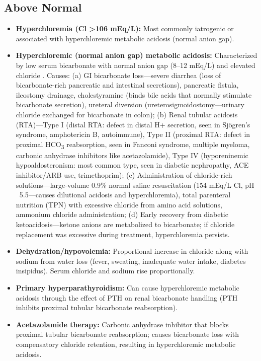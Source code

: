 \subsection*{Above Normal}
\begin{itemize}
  \item \textbf{Hyperchloremia (Cl >106 mEq/L):} Most commonly iatrogenic or associated with hyperchloremic metabolic acidosis (normal anion gap).
  \item \textbf{Hyperchloremic (normal anion gap) metabolic acidosis:} Characterized by low serum bicarbonate with normal anion gap (8--12 mEq/L) and elevated chloride \cite{seifter2014integration}. Causes: (a) GI bicarbonate loss---severe diarrhea (loss of bicarbonate-rich pancreatic and intestinal secretions), pancreatic fistula, ileostomy drainage, cholestyramine (binds bile acids that normally stimulate bicarbonate secretion), ureteral diversion (ureterosigmoidostomy---urinary chloride exchanged for bicarbonate in colon); (b) Renal tubular acidosis (RTA)---Type I (distal RTA: defect in distal H+ secretion, seen in Sj\"{o}gren's syndrome, amphotericin B, autoimmune), Type II (proximal RTA: defect in proximal HCO\textsubscript{3} reabsorption, seen in Fanconi syndrome, multiple myeloma, carbonic anhydrase inhibitors like acetazolamide), Type IV (hyporeninemic hypoaldosteronism: most common type, seen in diabetic nephropathy, ACE inhibitor/ARB use, trimethoprim); (c) Administration of chloride-rich solutions---large-volume 0.9\% normal saline resuscitation (154 mEq/L Cl, pH ~5.5---causes dilutional acidosis and hyperchloremia), total parenteral nutrition (TPN) with excessive chloride from amino acid solutions, ammonium chloride administration; (d) Early recovery from diabetic ketoacidosis---ketone anions are metabolized to bicarbonate; if chloride replacement was excessive during treatment, hyperchloremia persists.
  \item \textbf{Dehydration/hypovolemia:} Proportional increase in chloride along with sodium from water loss (fever, sweating, inadequate water intake, diabetes insipidus). Serum chloride and sodium rise proportionally.
  \item \textbf{Primary hyperparathyroidism:} Can cause hyperchloremic metabolic acidosis through the effect of PTH on renal bicarbonate handling (PTH inhibits proximal tubular bicarbonate reabsorption).
  \item \textbf{Acetazolamide therapy:} Carbonic anhydrase inhibitor that blocks proximal tubular bicarbonate reabsorption; causes bicarbonate loss with compensatory chloride retention, resulting in hyperchloremic metabolic acidosis.

\end{itemize}
